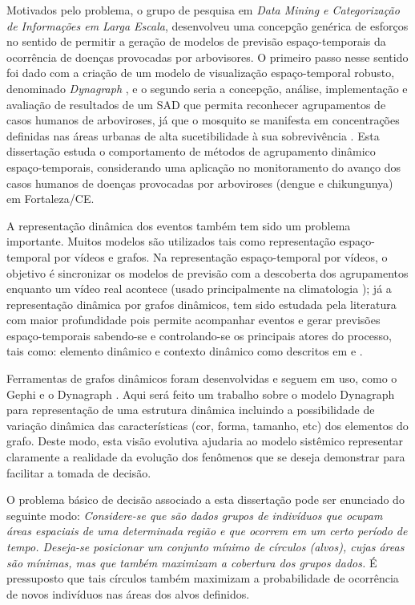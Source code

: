 Motivados pelo problema, o grupo de pesquisa em \textit{Data Mining e Categorização de Informações em Larga Escala}, desenvolveu uma concepção genérica de esforços no sentido de permitir a geração de modelos de previsão espaço-temporais da ocorrência de doenças provocadas por arbovisores. O primeiro passo nesse sentido foi dado com a criação de um modelo de visualização espaço-temporal robusto, denominado \emph{Dynagraph} \cite{dynagraph}, e o segundo seria a concepção, análise, implementação e avaliação de resultados de um \acrfull{SAD} que permita reconhecer agrupamentos de casos humanos de arboviroses, já que o mosquito se manifesta em concentrações definidas nas áreas urbanas de alta sucetibilidade à sua sobrevivência \cite{comportamentoDengue}.
Esta dissertação estuda o comportamento de métodos de agrupamento dinâmico espaço-temporais, considerando uma aplicação no monitoramento do avanço dos casos humanos de doenças provocadas por arboviroses (dengue e chikungunya) em Fortaleza/CE.

A representação dinâmica dos eventos também tem sido um problema importante. Muitos modelos são utilizados tais como representação espaço-temporal por vídeos e grafos. Na representação espaço-temporal por vídeos, o objetivo é sincronizar os modelos de previsão com a descoberta dos agrupamentos enquanto um vídeo real acontece (usado principalmente na climatologia \cite{faghmous2013}); já a representação dinâmica por grafos dinâmicos, tem sido estudada pela literatura com maior profundidade pois permite acompanhar eventos e gerar previsões espaço-temporais sabendo-se e controlando-se os principais atores do processo, tais como: elemento dinâmico e contexto dinâmico como descritos em \cite{holme:predictability} e \cite{Mitsa:2010}.

Ferramentas de grafos dinâmicos foram desenvolvidas e seguem em uso, como o Gephi \cite{gephi} e o Dynagraph \cite{dynagraph}. Aqui será feito um trabalho sobre o modelo Dynagraph para representação de uma estrutura dinâmica incluindo a possibilidade de variação dinâmica das características (cor, forma, tamanho, etc) dos elementos do grafo. Deste modo, esta visão evolutiva ajudaria ao modelo sistêmico representar claramente a realidade da evolução dos fenômenos que se deseja demonstrar para facilitar a tomada de decisão.

O problema básico de decisão associado a esta dissertação pode ser enunciado do seguinte modo: \emph{Considere-se que são dados grupos de indivíduos que ocupam áreas espaciais de uma determinada região e que ocorrem em um certo período de tempo. Deseja-se posicionar um conjunto mínimo de círculos (alvos), cujas áreas são mínimas, mas que também maximizam a cobertura dos grupos dados.} É pressuposto que tais círculos também maximizam a probabilidade de ocorrência de novos indivíduos nas áreas dos alvos definidos.

